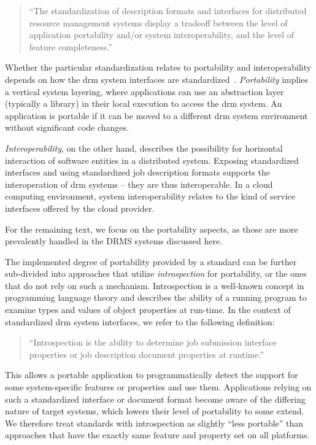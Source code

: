 \documentclass[twocolumn]{svjour3}       %
\begin{document}
\begin{quote}
``The standardization of description formats and interfaces for distributed resource management systems display a tradeoff between the level of application portability and/or system interoperability, and the level of feature completeness.''
\end{quote}

Whether the particular standardization relates to portability and interoperability depends on how the \gls{drm} system interfaces are standardized~\cite{citemaster_9638}. \emph{Portability} implies a vertical system layering, where applications can use an abstraction layer (typically a library) in their local execution to access the \gls{drm} system. An application is portable if it can be moved to a different \gls{drm} system environment without significant code changes. 

\emph{Interoperability}, on the other hand, describes the possibility for horizontal interaction of software entities in a distributed system.  Exposing standardized interfaces and using standardized job description formats supports the interoperation of \gls{drm} systems -- they are thus interoperable.  In a cloud computing environment, system interoperability relates to the kind of service interfaces offered by the cloud provider.


For the remaining text, we focus on the portability aspects, as those are more prevalently handled in the DRMS systems discussed here.

The implemented degree of portability provided by a standard can be further sub-divided into approaches that utilize \emph{introspection} for portability, or the ones that do not rely on such a mechanism. Introspection is a well-known concept in programming language theory and describes the ability of a running program to examine types and values of object properties at run-time. In the context of standardized \gls{drm} system interfaces, we refer to the following definition:

\begin{quote}
``Introspection is the ability to determine job submission interface properties or job description document properties at runtime.''
\end{quote}

This allows a portable application to programmatically detect the support for some system-specific features or properties and use them. Applications relying on such a standardized interface or document format become aware of the differing nature of target systems, which lowers their level of portability to some extend. We therefore treat standards with introspection as slightly ``less portable'' than approaches that have the exactly same feature and property set on all platforms.
\end{document}

